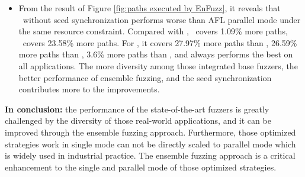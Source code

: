 \begin{itemize}
\item From the result of Figure \ref{fig:paths executed by EnFuzz}, it reveals that \toolFour ~without seed synchronization performs worse than AFL parallel mode under the same resource constraint. Compared with \toolOne, \toolFive ~covers 
1.09\% more paths, \toolTwo ~covers 23.58\% more paths. 
For \toolThree, it covers 27.97\% more paths than \toolOne, 26.59\% more paths than \toolFive,  3.6\% more paths than \toolTwo, and always performs the best on all applications. 
The more diversity among those integrated base fuzzers, the better performance of ensemble fuzzing, and the seed synchronization contributes more to the improvements.

\end{itemize}

\noindent\textbf{In conclusion: }the performance of the state-of-the-art fuzzers is greatly challenged by the diversity of those real-world applications, and it can be improved through the ensemble fuzzing approach. Furthermore, those optimized strategies work in single mode can not be directly scaled to parallel mode which is widely used in industrial practice. The ensemble fuzzing approach is a critical enhancement to the single and parallel mode of those optimized strategies. 



